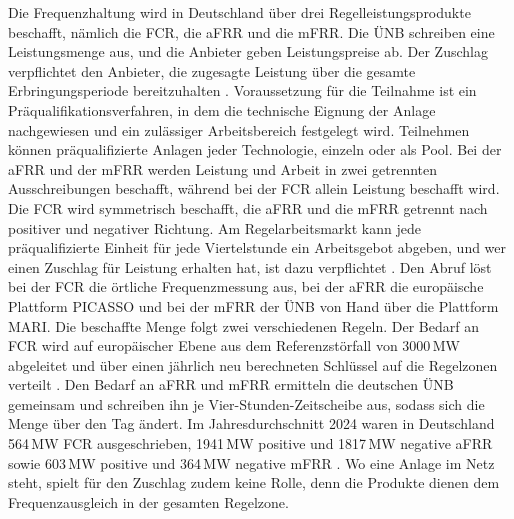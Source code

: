 Die Frequenzhaltung wird in Deutschland über drei Regelleistungsprodukte beschafft, nämlich die \ac{FCR}, die \ac{aFRR} und die \ac{mFRR}.
Die \ac{ÜNB} schreiben eine Leistungsmenge aus, und die Anbieter geben Leistungspreise ab.
Der Zuschlag verpflichtet den Anbieter, die zugesagte Leistung über die gesamte Erbringungsperiode bereitzuhalten \cite{ubertragungsnetzbetreiber_deutschland_praqualifikationsverfahren_2024}.
Voraussetzung für die Teilnahme ist ein Präqualifikationsverfahren, in dem die technische Eignung der Anlage nachgewiesen und ein zulässiger Arbeitsbereich festgelegt wird.
Teilnehmen können präqualifizierte Anlagen jeder Technologie, einzeln oder als Pool.
Bei der \ac{aFRR} und der \ac{mFRR} werden Leistung und Arbeit in zwei getrennten Ausschreibungen beschafft, während bei der \ac{FCR} allein Leistung beschafft wird.
Die \ac{FCR} wird symmetrisch beschafft, die \ac{aFRR} und die \ac{mFRR} getrennt nach positiver und negativer Richtung.
Am Regelarbeitsmarkt kann jede präqualifizierte Einheit für jede Viertelstunde ein Arbeitsgebot abgeben, und wer einen Zuschlag für Leistung erhalten hat, ist dazu verpflichtet \cite{bundesnetzagentur_monitoringbericht_2026}.
Den Abruf löst bei der \ac{FCR} die örtliche Frequenzmessung aus, bei der \ac{aFRR} die europäische Plattform PICASSO und bei der \ac{mFRR} der \ac{ÜNB} von Hand über die Plattform MARI.
Die beschaffte Menge folgt zwei verschiedenen Regeln.
Der Bedarf an \ac{FCR} wird auf europäischer Ebene aus dem Referenzstörfall von 3000\,\si{MW} abgeleitet und über einen jährlich neu berechneten Schlüssel auf die Regelzonen verteilt \cite{europaische_kommission_verordnung_2017}.
Den Bedarf an \ac{aFRR} und \ac{mFRR} ermitteln die deutschen \ac{ÜNB} gemeinsam und schreiben ihn je Vier-Stunden-Zeitscheibe aus, sodass sich die Menge über den Tag ändert.
Im Jahresdurchschnitt 2024 waren in Deutschland 564\,\si{MW} \ac{FCR} ausgeschrieben, 1941\,\si{MW} positive und 1817\,\si{MW} negative \ac{aFRR} sowie 603\,\si{MW} positive und 364\,\si{MW} negative \ac{mFRR} \cite{bundesnetzagentur_monitoringbericht_2026}.
Wo eine Anlage im Netz steht, spielt für den Zuschlag zudem keine Rolle, denn die Produkte dienen dem Frequenzausgleich in der gesamten Regelzone.

